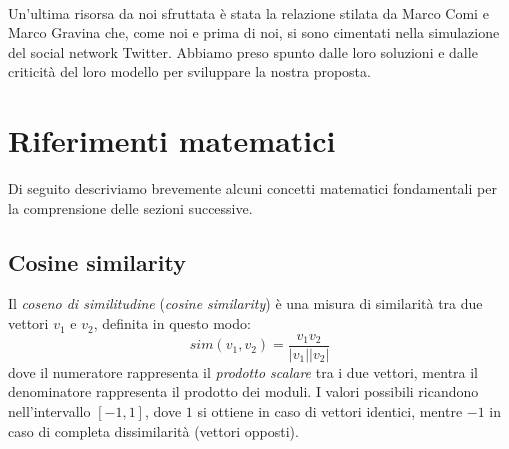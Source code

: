 \documentclass[a4paper,12pt]{article}
\begin{document}
\\
Un'ultima risorsa da noi sfruttata è stata la relazione stilata da Marco Comi e Marco Gravina che, come noi e prima di noi, si sono cimentati nella simulazione del social network Twitter. Abbiamo preso spunto dalle loro soluzioni e dalle criticità del loro modello per sviluppare la nostra proposta.
\section{Riferimenti matematici}
Di seguito descriviamo brevemente alcuni concetti matematici fondamentali per la comprensione delle sezioni successive.
\label{sec:mat}
\subsection{Cosine similarity}
\label{subsec:cos}
Il \textit{coseno di similitudine} (\textit{cosine similarity}) \cite{ir} è una misura di similarità tra due vettori $v_1$ e $v_2$, definita in questo modo:
\begin{equation}
sim(v_1,v_2) = \dfrac{v_1v_2}{|v_1||v_2|}
\end{equation}
dove il numeratore rappresenta il \textit{prodotto scalare} tra i due vettori, mentra il denominatore rappresenta il prodotto dei moduli. I valori possibili ricandono nell'intervallo $[-1,1]$, dove $1$ si ottiene in caso di vettori identici, mentre $-1$ in caso di completa dissimilarità (vettori opposti). 
\end{document}
